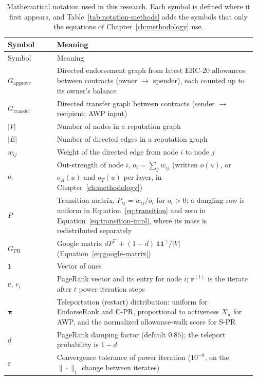 \begin{longtable}{@{}>{\raggedright\arraybackslash}p{0.19\linewidth}p{0.77\linewidth}@{}}
\caption[Mathematical notation used in this research.]{Mathematical notation used in this research. Each symbol is defined where it first appears, and Table~\ref{tab:notation-methods} adds the symbols that only the equations of Chapter~\ref{ch:methodology} use.}\label{tab:notation}\\
\toprule
Symbol & Meaning \\
\midrule
\endfirsthead
\toprule
Symbol & Meaning \\
\midrule
\endhead
\bottomrule
\endfoot
$G_{\mathrm{approve}}$ & Directed endorsement graph from latest ERC-20 allowances between contracts (owner $\to$ spender), each counted up to its owner's balance \\
$G_{\mathrm{transfer}}$ & Directed transfer graph between contracts (sender $\to$ recipient; AWP input) \\
$|V|$ & Number of nodes in a reputation graph \\
$|E|$ & Number of directed edges in a reputation graph \\
$w_{ij}$ & Weight of the directed edge from node $i$ to node $j$ \\
$o_i$ & Out-strength of node $i$, $o_i=\sum_j w_{ij}$ (written $o(u)$, or $o_A(u)$ and $o_T(u)$ per layer, in Chapter~\ref{ch:methodology}) \\
$P$ & Transition matrix, $P_{ij}=w_{ij}/o_i$ for $o_i>0$; a dangling row is uniform in Equation~\eqref{eq:transition} and zero in Equation~\eqref{eq:transition-impl}, where its mass is redistributed separately \\
$G_{\mathrm{PR}}$ & Google matrix $dP^{\top}+(1-d)\,\mathbf{1}\mathbf{1}^{\top}/|V|$ (Equation~\eqref{eq:google-matrix}) \\
$\mathbf{1}$ & Vector of ones \\
$\mathbf{r}$, $r_i$ & PageRank vector and its entry for node $i$; $\mathbf{r}^{(t)}$ is the iterate after $t$ power-iteration steps \\
$\boldsymbol{\pi}$ & Teleportation (restart) distribution: uniform for EndorseRank and \mbox{C-PR}, proportional to activeness $X_u$ for AWP, and the normalized allowance-walk score for \mbox{S-PR} \\
$d$ & PageRank damping factor (default $0.85$); the teleport probability is $1-d$ \\
$\varepsilon$ & Convergence tolerance of power iteration ($10^{-8}$, on the $\|\cdot\|_1$ change between iterates) \\

\end{longtable}
